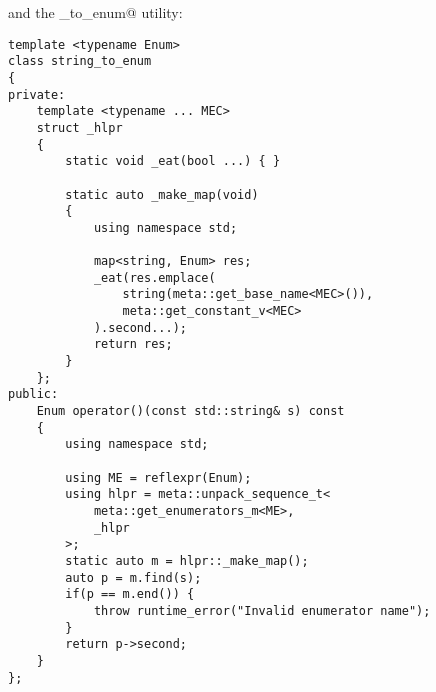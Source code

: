 and the \verb@string_to_enum@ utility:

\begin{verbatim}
template <typename Enum>
class string_to_enum
{
private:
	template <typename ... MEC>
	struct _hlpr
	{
		static void _eat(bool ...) { }

		static auto _make_map(void)
		{
			using namespace std;

			map<string, Enum> res;
			_eat(res.emplace(
				string(meta::get_base_name<MEC>()),
				meta::get_constant_v<MEC>
			).second...);
			return res;
		}
	};
public:
	Enum operator()(const std::string& s) const
	{
		using namespace std;

		using ME = reflexpr(Enum);
		using hlpr = meta::unpack_sequence_t<
			meta::get_enumerators_m<ME>,
			_hlpr
		>;
		static auto m = hlpr::_make_map();
		auto p = m.find(s);
		if(p == m.end()) {
			throw runtime_error("Invalid enumerator name");
		}
		return p->second;
	}
};
\end{verbatim}

